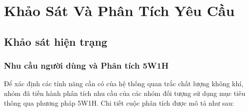 \chapter{Khảo Sát Và Phân Tích Yêu Cầu}

\section{Khảo sát hiện trạng}
\subsection{Nhu cầu người dùng và Phân tích 5W1H}
Để xác định các tính năng cần có của hệ thống quan trắc chất lượng không khí, nhóm đã tiến hành phân tích nhu cầu của các nhóm đối tượng sử dụng mục tiêu thông qua phương pháp 5W1H. Chi tiết cuộc phân tích được mô tả như sau:
